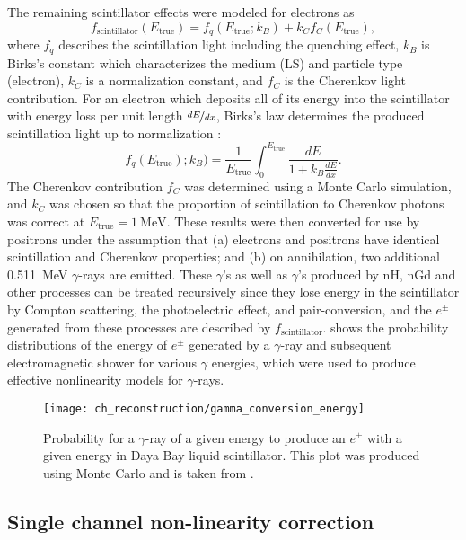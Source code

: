 The remaining scintillator effects were modeled for electrons as
\begin{equation}
    f_{\text{scintillator}}(E_{\text{true}}) =
    f_q(E_{\text{true}};k_B) + k_Cf_C(E_{\text{true}}),
\end{equation}
where $f_q$ describes the scintillation light including the quenching effect,
$k_B$ is Birks's constant which characterizes the medium (LS)
and particle type (electron),
$k_C$ is a normalization constant,
and $f_C$ is the Cherenkov light contribution.
For an electron which deposits all of its energy into the scintillator
with energy loss per unit length $\nicefrac{dE}{dx}$,
Birks's law determines the produced scintillation light up to normalization \cite{birks}:
\begin{equation}
    f_q(E_{\text{true}});k_B) = \frac{1}{E_{\text{true}}} \int_0^{E_{\text{true}}}
    \frac{dE}{1+k_B\frac{dE}{dx}}.
\end{equation}
The Cherenkov contribution $f_C$ was determined using a Monte Carlo simulation,
and $k_C$ was chosen so that the proportion of scintillation to Cherenkov photons
was correct at $E_{\text{true}} = \SI{1}{\MeV}$.
These results were then converted for use by positrons under the assumption that
(a) electrons and positrons have identical scintillation and Cherenkov properties;
and (b) on annihilation, two additional \SI{0.511}{\MeV} $\gamma$-rays are emitted.
These $\gamma$'s as well as $\gamma$'s produced by nH, nGd and other processes
can be treated recursively
since they lose energy in the scintillator
by Compton scattering, the photoelectric effect, and pair-conversion,
and the $e^{\pm}$ generated from these processes
are described by $f_{\text{scintillator}}$.
 shows the probability distributions
of the energy of $e^{\pm}$ generated by a $\gamma$-ray
and subsequent electromagnetic shower for various $\gamma$ energies,
which were used to produce effective nonlinearity models for $\gamma$-rays.

\begin{figure}
    \centering
    \texttt{[image: ch\_reconstruction/gamma\_conversion\_energy]}
    \caption{
        Probability for a $\gamma$-ray of a given energy to produce
        an $e^{\pm}$ with a given energy in Daya Bay liquid scintillator.
        This plot was produced using Monte Carlo and is taken from \cite{nonlinearity1}.
    }
    \label{fig:gamma_conversion}
\end{figure}

\subsection{Single channel non-linearity correction}
\label{subsec:scnl}

